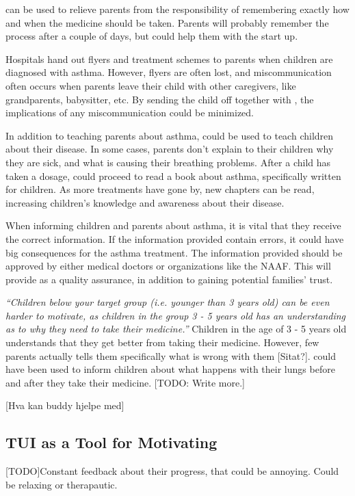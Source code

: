 \buddy{} can be used to relieve parents from the responsibility of remembering exactly how and when the medicine should be taken. Parents will probably remember the process after a couple of days, but \buddy{} could help them with the start up. 

Hospitals hand out flyers and treatment schemes to parents when children are diagnosed with asthma. However, flyers are often lost, and miscommunication often occurs when parents leave their child with other caregivers, like grandparents, babysitter, etc. By sending the child off together with \buddy{}, the implications of any miscommunication could be minimized.    

In addition to teaching parents about asthma, \buddy{} could be used to teach children about their disease. In some cases, parents don't explain to their children why they are sick, and what is causing their breathing problems. After a child has taken a dosage, \buddy{} could proceed to read a book about asthma, specifically written for children. As more treatments have gone by, new chapters can be read, increasing children's knowledge and awareness about their disease.   

When informing children and parents about asthma, it is vital that they receive the correct information. If the information provided contain errors, it could have big consequences for the asthma treatment. The information provided should be approved by either medical doctors or organizations like the NAAF. This will provide as a quality assurance, in addition to gaining potential families' trust.    

\textit{``Children below your target group (i.e. younger than 3 years old) can be even harder to motivate, as children in the group 3 - 5 years old has an understanding as to why they need to take their medicine.''}
Children in the age of 3 - 5 years old understands that they get better from taking their medicine. However, few parents actually tells them specifically what is wrong with them [Sitat?]. \buddy{} could have been used to inform children about what happens with their lungs before and after they take their medicine. 
[TODO: Write more.] 

[Hva kan buddy hjelpe med]

\subsection{TUI as a Tool for Motivating}
\label{sec:tuiasatoolformotivating}
[TODO]Constant feedback about their progress, that could be annoying.
Could be relaxing or therapautic. 

